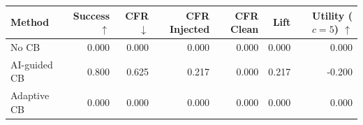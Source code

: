 \begin{tabular}{lrrrrrr}
\toprule
Method & Success $\uparrow$ & CFR $\downarrow$ & CFR Injected & CFR Clean & Lift & Utility ($c=5$) $\uparrow$ \\
\midrule
No CB & 0.000 & 0.000 & 0.000 & 0.000 & 0.000 & 0.000 \\
AI-guided CB & 0.800 & 0.625 & 0.217 & 0.000 & 0.217 & -0.200 \\
Adaptive CB & 0.000 & 0.000 & 0.000 & 0.000 & 0.000 & 0.000 \\
\bottomrule
\end{tabular}
